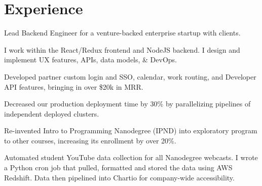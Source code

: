 \documentclass[]{deedy-resume-openfont}
\begin{document}
\begin{minipage}[t]{0.66\textwidth}


\section{Experience}

\vspace{\topsep} %
\begin{tightemize}

\item Lead Backend Engineer for a venture-backed enterprise startup with clients.
\item I work within the React/Redux frontend and NodeJS backend. I design and implement UX features, APIs, data models, \& DevOps.
\item Developed partner custom login and SSO, calendar, work routing, and Developer API features, bringing in over \$20k in MRR.
\item Decreased our production deployment time by 30\% by parallelizing pipelines of independent deployed clusters.

\end{tightemize}
\sectionsep

\begin{tightemize}

\item Re-invented Intro to Programming Nanodegree (IPND) into exploratory program to other courses, increasing its enrollment by over 20\%.


\item Automated student YouTube data collection for all Nanodegree webcasts. I wrote a Python cron job that pulled, formatted and stored the data using AWS Redshift. Data then pipelined into Chartio for company-wide accessibility.
\end{tightemize}
\sectionsep


\end{minipage}
\end{document}
